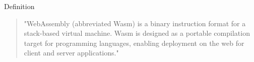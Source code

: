 \documentclass{beamer}
\begin{document}
\begin{frame}{Definition}
\begin{quotation}
"WebAssembly (abbreviated Wasm) is a binary instruction format for a stack-based virtual machine. Wasm is designed as a portable compilation target for programming languages, enabling deployment on the web for client and server applications."
\end{quotation}
\end{frame}
\end{document}
